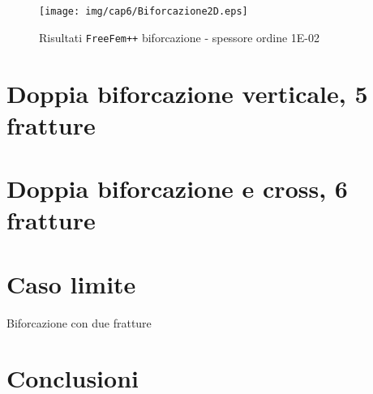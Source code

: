 \begin{figure}[h!]
\centering
\texttt{[image: img/cap6/Biforcazione2D.eps]}
\caption{Risultati \texttt{FreeFem++} biforcazione - spessore ordine 1E-02 }\label{Biforcazione1E-02}
\end{figure}

\section{Doppia biforcazione verticale, 5 fratture}

\section{Doppia biforcazione e cross, 6 fratture}

\section{Caso limite}
Biforcazione con due fratture

\section{Conclusioni}